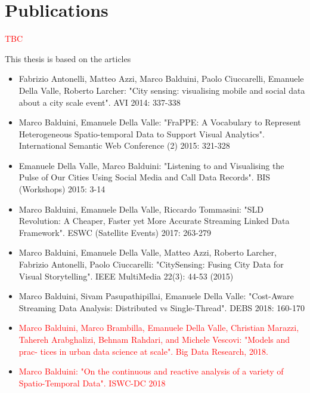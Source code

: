 \section{Publications}

\textcolor{red}{TBC}

This thesis is based on the articles \cite{DBLP:conf/avi/AntonelliABCVL14,DBLP:conf/semweb/BalduiniV15,DBLP:conf/bis/ValleB15,DBLP:conf/esws/BalduiniV017a,DBLP:journals/ieeemm/BalduiniVALAC15,DBLP:conf/debs/BalduiniPV18,BalduiniJBD2018,BalduiniISWC2018DC}

\begin{itemize}
\item Fabrizio Antonelli, Matteo Azzi, Marco Balduini, Paolo Ciuccarelli, Emanuele Della Valle, Roberto Larcher:
"City sensing: visualising mobile and social data about a city scale event". AVI 2014: 337-338
\item Marco Balduini, Emanuele Della Valle:
"FraPPE: A Vocabulary to Represent Heterogeneous Spatio-temporal Data to Support Visual Analytics". International Semantic Web Conference (2) 2015: 321-328
\item 	Emanuele Della Valle, Marco Balduini:
"Listening to and Visualising the Pulse of Our Cities Using Social Media and Call Data Records". BIS (Workshops) 2015: 3-14
\item 	Marco Balduini, Emanuele Della Valle, Riccardo Tommasini:
"SLD Revolution: A Cheaper, Faster yet More Accurate Streaming Linked Data Framework". ESWC (Satellite Events) 2017: 263-279
\item Marco Balduini, Emanuele Della Valle, Matteo Azzi, Roberto Larcher, Fabrizio Antonelli, Paolo Ciuccarelli:
"CitySensing: Fusing City Data for Visual Storytelling". IEEE MultiMedia 22(3): 44-53 (2015)
\item Marco Balduini, Sivam Pasupathipillai, Emanuele Della Valle:
"Cost-Aware Streaming Data Analysis: Distributed vs Single-Thread". DEBS 2018: 160-170
\item \textcolor{red}{Marco Balduini, Marco Brambilla, Emanuele Della Valle, Christian Marazzi, Tahereh Arabghalizi, Behnam Rahdari, and Michele Vescovi:
"Models and prac- tices in urban data science at scale". Big Data Research, 2018.}
\item \textcolor{red}{Marco Balduini:
"On the continuous and reactive analysis of a variety of Spatio-Temporal Data". ISWC-DC 2018}
\end{itemize}